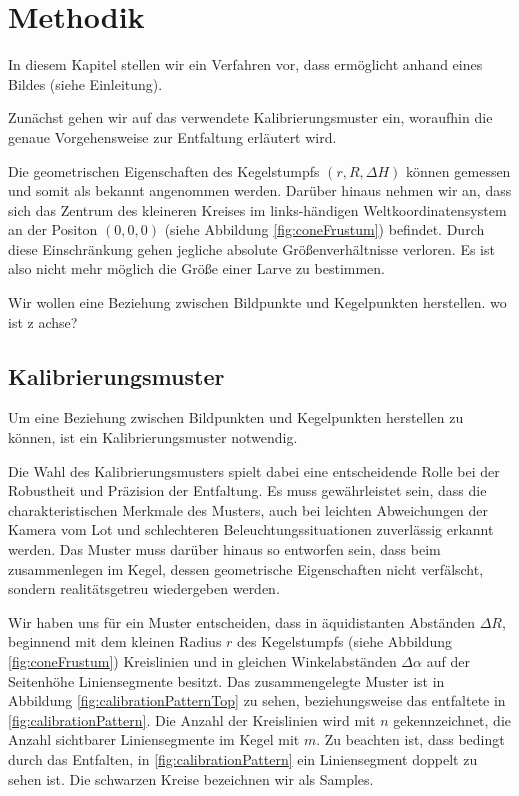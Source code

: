 \chapter{Methodik}
\label{ch:method}

In diesem Kapitel stellen wir ein Verfahren vor, dass ermöglicht anhand eines Bildes (siehe Einleitung).

Zunächst gehen wir auf das verwendete Kalibrierungsmuster ein, woraufhin die genaue Vorgehensweise zur Entfaltung erläutert wird. 

Die geometrischen Eigenschaften des Kegelstumpfs $(r, R, \Delta H)$ können gemessen und somit als bekannt angenommen werden. 
Darüber hinaus nehmen wir an, dass sich das Zentrum des kleineren Kreises im links-händigen Weltkoordinatensystem an der Positon $(0,0,0)$ (siehe Abbildung \ref{fig:coneFrustum}) befindet. Durch diese Einschränkung gehen jegliche absolute Größenverhältnisse verloren. Es ist also nicht mehr möglich die Größe einer Larve zu bestimmen. 

Wir wollen eine Beziehung zwischen Bildpunkte und Kegelpunkten herstellen. wo ist z achse?


\section{Kalibrierungsmuster}
\label{s:calibrationPattern}
Um eine Beziehung zwischen Bildpunkten und Kegelpunkten herstellen zu können, ist ein Kalibrierungsmuster notwendig.

Die Wahl des Kalibrierungsmusters spielt dabei eine entscheidende Rolle bei der Robustheit und Präzision der Entfaltung. Es muss gewährleistet sein, dass die charakteristischen Merkmale des Musters, auch bei leichten Abweichungen der Kamera vom Lot und schlechteren Beleuchtungssituationen zuverlässig erkannt werden. Das Muster muss darüber hinaus so entworfen sein, dass beim zusammenlegen im Kegel, dessen geometrische Eigenschaften nicht verfälscht, sondern realitätsgetreu wiedergeben werden. 

Wir haben uns für ein Muster entscheiden, dass in äquidistanten Abständen $\Delta R$, beginnend mit dem kleinen Radius $r$ des Kegelstumpfs (siehe Abbildung \ref{fig:coneFrustum}) Kreislinien und in gleichen Winkelabständen $\Delta \alpha$ auf der Seitenhöhe Liniensegmente besitzt. Das zusammengelegte Muster ist in Abbildung \ref{fig:calibrationPatternTop} zu sehen, beziehungsweise das entfaltete in \ref{fig:calibrationPattern}. Die Anzahl der Kreislinien wird mit $n$ gekennzeichnet, die Anzahl sichtbarer Liniensegmente im Kegel mit $m$. Zu beachten ist, dass bedingt durch das Entfalten, in \ref{fig:calibrationPattern}  ein Liniensegment doppelt zu sehen ist. Die schwarzen Kreise bezeichnen wir als Samples. 

